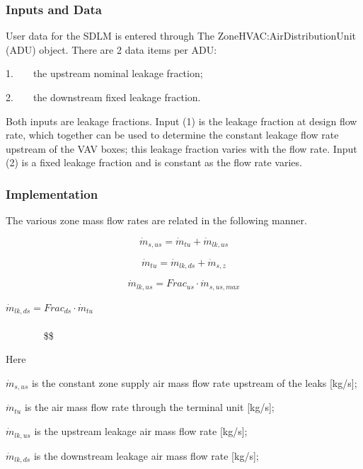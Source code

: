 \subsubsection{Inputs and Data}\label{inputs-and-data-3-000}

User data for the SDLM is entered through The ZoneHVAC:AirDistributionUnit (ADU) object. There are 2 data items per ADU:

1.~~~~the upstream nominal leakage fraction;

2.~~~~the downstream fixed leakage fraction.

Both inputs are leakage fractions. Input (1) is the leakage fraction at design flow rate, which together can be used to determine the constant leakage flow rate upstream of the VAV boxes; this leakage fraction varies with the flow rate. Input (2) is a fixed leakage fraction and is constant as the flow rate varies.

\subsubsection{Implementation}\label{implementation-000}

The various zone mass flow rates are related in the following manner.

\begin{equation}
{\dot m_{s,us}} = {\dot m_{tu}} + {\dot m_{lk,us}}
\end{equation}

\begin{equation}
{\dot m_{tu}} = {\dot m_{lk,ds}} + {\dot m_{s,z}}
\end{equation}

\begin{equation}
{\dot m_{lk,us}} = Fra{c_{us}} \cdot {\dot m_{s,us,max}}
\end{equation}

\({\dot m_{lk,ds}} = Fra{c_{ds}} \cdot {\dot m_{tu}}\) ~~~~~~~~~~~~~~~~~~~~~~~~~~~~~~~~~~~~~~~~~~~~~~~~~~~~~~~~~~~~~~~~~~~~~~~~~~~~~~~ \$\$

Here

\({\dot m_{s,us}}\) is the constant zone supply air mass flow rate upstream of the leaks {[}kg/s{]};

\({\dot m_{tu}}\) is the air mass flow rate through the terminal unit {[}kg/s{]};

\({\dot m_{lk,us}}\) is the upstream leakage air mass flow rate {[}kg/s{]};

\({\dot m_{lk,ds}}\) is the downstream leakage air mass flow rate {[}kg/s{]};

